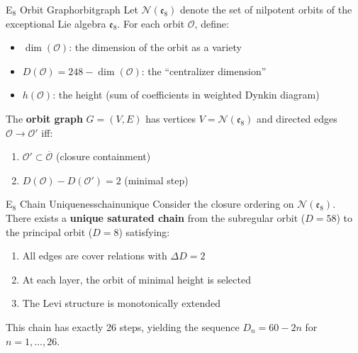\begin{definition}{E$_8$ Orbit Graph}{orbitgraph}
Let $\mathcal{N}(\mathfrak{e}_8)$ denote the set of nilpotent orbits of the 
exceptional Lie algebra $\mathfrak{e}_8$. For each orbit $\mathcal{O}$, define:
\begin{itemize}[leftmargin=1.5em, topsep=2pt, itemsep=1pt]
    \item $\dim(\mathcal{O})$: the dimension of the orbit as a variety
    \item $D(\mathcal{O}) = 248 - \dim(\mathcal{O})$: the ``centralizer dimension''
    \item $h(\mathcal{O})$: the height (sum of coefficients in weighted Dynkin diagram)
\end{itemize}
The \textbf{orbit graph} $G = (V, E)$ has vertices $V = \mathcal{N}(\mathfrak{e}_8)$ 
and directed edges $\mathcal{O} \to \mathcal{O}'$ iff:
\begin{enumerate}[leftmargin=1.5em, topsep=2pt, itemsep=1pt]
    \item $\mathcal{O}' \subset \overline{\mathcal{O}}$ (closure containment)
    \item $D(\mathcal{O}) - D(\mathcal{O}') = 2$ (minimal step)
\end{enumerate}
\end{definition}

\begin{theorem}{E$_8$ Chain Uniqueness}{chainunique}
Consider the closure ordering on $\mathcal{N}(\mathfrak{e}_8)$. There exists a 
\textbf{unique saturated chain} from the subregular orbit ($D = 58$) to the 
principal orbit ($D = 8$) satisfying:
\begin{enumerate}[leftmargin=1.5em, topsep=2pt, itemsep=1pt]
    \item All edges are cover relations with $\Delta D = 2$
    \item At each layer, the orbit of minimal height is selected
    \item The Levi structure is monotonically extended
\end{enumerate}
This chain has exactly 26 steps, yielding the sequence $D_n = 60 - 2n$ for $n = 1, \ldots, 26$.
\end{theorem}

